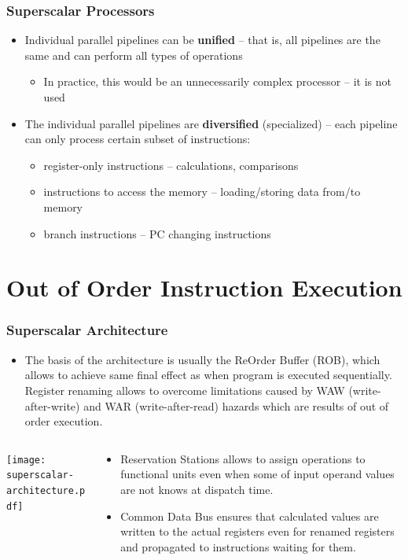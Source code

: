 \documentclass{beamer}
\begin{document}
\begin{frame}
\frametitle{Superscalar Processors}

\begin{itemize}
\item Individual parallel pipelines can be \textbf{unified} -- that is, all pipelines are the same and can perform all types of operations
  \begin{itemize}
  \item In practice, this would be an unnecessarily complex processor -- it is not used
  \end{itemize}
\item The individual parallel pipelines are \textbf{diversified} (specialized) -- each pipeline can only process certain subset of instructions:
  \begin{itemize}
  \item register-only instructions -- calculations, comparisons
  \item instructions to access the memory -- loading/storing data from/to memory
  \item branch instructions -- PC changing instructions
  \end{itemize}
\end{itemize}
\end{frame}

\section{Out of Order Instruction Execution}

\begin{frame}
\frametitle{Superscalar Architecture}
\begin{itemize}
\item The basis of the architecture is usually the ReOrder Buffer (ROB), which allows to achieve same final effect as when program is executed sequentially. Register renaming allows to overcome limitations caused by WAW (write-after-write) and WAR (write-after-read) hazards which are results of out of order execution.
\end{itemize}
\begin{columns}
\begin{column}{0.50\textwidth}
\texttt{[image: superscalar-architecture.pdf]}
\end{column}
\begin{column}{0.50\textwidth}
\begin{itemize}
\item Reservation Stations allows to assign operations to functional units even when some of input operand values are not knows at dispatch time.
\item Common Data Bus ensures that calculated values are written to the actual registers even for renamed registers and propagated to instructions waiting for them.
\end{itemize}
\end{column}
\end{columns}
\end{frame}
\end{document}
